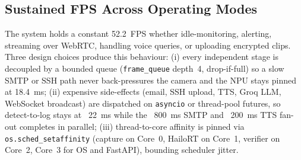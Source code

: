 \documentclass{ieeeaccess}
\begin{document}
\begin{table}[ht!]
\caption{\textbf{YOLOv8 Variant Selection (Hailo-8L Budget). YOLOv8s FPS is the directly measured on-chip value; YOLOv8n, YOLOv8m, and YOLOv8l FPS figures are scaled from GFLOPs against the measured YOLOv8s operating point ($\mathrm{FPS}_{\mathrm{var}} \approx \mathrm{FPS}_{s} \cdot \mathrm{GFLOPs}_{s} / \mathrm{GFLOPs}_{\mathrm{var}}$) and cross-checked against Hailo Model Zoo reference latencies.}}
\label{tab:arch_select}
\setlength{\tabcolsep}{3pt}
\centering\small
{}
\end{table}

\subsection{Sustained FPS Across Operating Modes}
\label{sec:async_fps}
The system holds a constant 52.2~FPS whether idle-monitoring, alerting, streaming over WebRTC, handling voice queries, or uploading encrypted clips. Three design choices produce this behaviour: (i) every independent stage is decoupled by a bounded queue (\texttt{frame\_queue} depth~4, drop-if-full) so a slow SMTP or SSH path never back-pressures the camera and the NPU stays pinned at 18.4~ms; (ii) expensive side-effects (email, SSH upload, TTS, Groq LLM, WebSocket broadcast) are dispatched on \texttt{asyncio} or thread-pool futures, so detect-to-log stays at ~22~ms while the ~800~ms SMTP and ~200~ms TTS fan-out completes in parallel; (iii) thread-to-core affinity is pinned via \texttt{os.sched\_setaffinity} (capture on Core~0, HailoRT on Core~1, verifier on Core~2, Core~3 for OS and FastAPI), bounding scheduler jitter.
\end{document}
